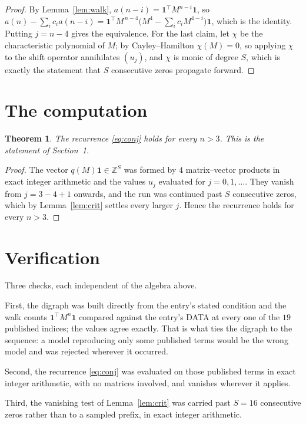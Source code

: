 \documentclass[11pt,a4paper]{article}
\theoremstyle{plain}
\newtheorem{theorem}{Theorem}
\theoremstyle{definition}
\begin{document}
\begin{proof}
By Lemma~\ref{lem:walk}, $a(n-i)=\mathbf{1}^{\!\top}M^{n-i}\mathbf{1}$, so
$a(n)-\sum_i c_i a(n-i)
=\mathbf{1}^{\!\top}M^{\,n-4}\bigl(M^{4}-\sum_i c_i M^{4-i}\bigr)
\mathbf{1}$, which is the identity. Putting $j=n-4$ gives the equivalence. For the
last claim, let $\chi$ be the characteristic polynomial of $M$; by Cayley--Hamilton
$\chi(M)=0$, so applying $\chi$ to the shift operator annihilates $(u_j)$, and $\chi$ is
monic of degree $S$, which is exactly the statement that $S$ consecutive zeros propagate
forward.
\end{proof}

\section{The computation}

\begin{theorem}
The recurrence \eqref{eq:conj} holds for every $n>3$. This is the statement of
Section~1.
\end{theorem}

\begin{proof}
The vector $q(M)\mathbf{1}\in\mathbb{Z}^{S}$ was formed by $4$ matrix--vector
products in exact integer arithmetic and the values $u_j$ evaluated for
$j=0,1,\dots$. They vanish from $j=3-4+1$ onwards, and the run was continued past
$S$ consecutive zeros, which by Lemma~\ref{lem:crit} settles every larger $j$. Hence the
recurrence holds for every $n>3$.
\end{proof}

\section{Verification}

Three checks, each independent of the algebra above.

First, the digraph was built directly from the entry's stated condition and the walk counts
$\mathbf{1}^{\!\top}M^{n}\mathbf{1}$ compared against the entry's DATA at every one of
the $19$ published indices; the values agree exactly. That is what ties the digraph to
the sequence: a model reproducing only some published terms would be the wrong model and
was rejected wherever it occurred.

Second, the recurrence \eqref{eq:conj} was evaluated on those published terms in exact
integer arithmetic, with no matrices involved, and vanishes wherever it applies.

Third, the vanishing test of Lemma~\ref{lem:crit} was carried past $S=16$ consecutive
zeros rather than to a sampled prefix, in exact integer arithmetic.
\end{document}

